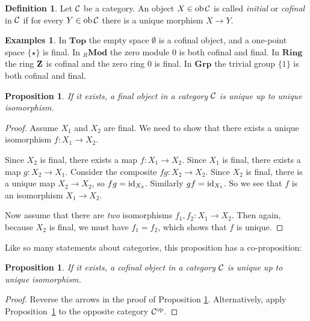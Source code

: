 \documentclass[11pt]{amsbook}
\DeclareMathOperator\Mod{{\bf{Mod}}}
\DeclareMathOperator\ob{ob}
\def\id{{\rm id}}
\def\opp{\mathrm{op}}
\def\Top{\mathbf{Top}}
\def\Grp{\mathbf{Grp}}
\def\Ring{\mathbf{Ring}}
\def\Mod{\mathbf{Mod}}
\theoremstyle{plain}
\newtheorem{proposition}[theorem]{Proposition}
\theoremstyle{definition}
\newtheorem{definition}[theorem]{Definition}
\newtheorem{examples}[theorem]{Examples}
\begin{document}
\begin{definition}
Let ${\mathcal{C}}$ be a category. An object $X\in \ob \cC$ is called \emph{initial} or \emph{cofinal} in ${\mathcal{C}}$ if for every $Y\in \ob\cC$ there is a 
unique morphism $X\to Y$.
\end{definition}

\begin{examples}
In $\Top$ the empty space $\emptyset$ is a cofinal object, and a one-point space $\{\star\}$ is final. In ${}_R\Mod$ the zero module $0$ is both cofinal and final. In $\Ring$ the ring ${\mathbf{Z}}$ is cofinal and the zero ring $0$ is final. In $\Grp$ the trivial group $\{1\}$ is both cofinal and final.
\end{examples}

\begin{proposition}\label{prop:final-object-uniquely-unique}
If it exists, a final object in a category ${\mathcal{C}}$ is unique up to unique isomorphism.
\end{proposition}

\begin{proof}
Assume $X_1$ and $X_2$ are final. We need to show that there exists a unique isomorphism $f\colon X_1\to X_2$.

Since $X_2$ is final, there exists a map $f\colon X_1\to X_2$. Since $X_1$ is final, there exists a map $g\colon X_2\to X_1$. Consider the composite $fg\colon X_2 \to X_2$. Since $X_2$ is final, there is a unique map $X_2\to X_2$, so $fg=\id_{X_2}$. Similarly $gf=\id_{X_1}$. So we see that $f$ is an isomorphism $X_1\to X_2$.

Now assume that there are \emph{two} isomorphisms $f_1,f_2\colon X_1 \to X_2$. Then again, because $X_2$ is final, we must have $f_1=f_2$, which shows that $f$ is unique. 
\end{proof}

Like so many statements about categories, this proposition has a co-proposition:

\begin{proposition}
If it exists, a cofinal object in a category ${\mathcal{C}}$ is unique up to unique isomorphism.
\end{proposition}

\begin{proof}Reverse the arrows in the proof of Proposition \ref{prop:final-object-uniquely-unique}. Alternatively, apply 
Proposition~\ref{prop:final-object-uniquely-unique} to the opposite category $\cC^\opp$.
\end{proof}
\end{document}
